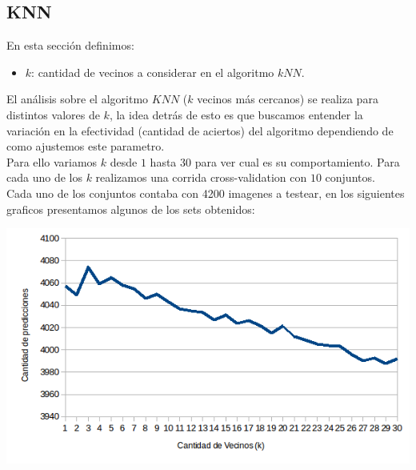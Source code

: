 \subsection{KNN}
En esta sección definimos:
\begin{itemize}
	\item $k$: cantidad de vecinos a considerar en el algoritmo $kNN$.
\end{itemize}
El análisis sobre el algoritmo $KNN$ ($k$ vecinos más cercanos) se realiza para distintos valores de $k$, la idea detrás de esto es que buscamos entender la variación en la efectividad (cantidad de aciertos) del algoritmo dependiendo de como ajustemos este parametro.
\\
Para ello variamos $k$ desde $1$ hasta $30$ para ver cual es su comportamiento. Para cada uno de los $k$ realizamos una corrida cross-validation con $10$ conjuntos.
\\
Cada uno de los conjuntos contaba con 4200 imagenes a testear, en los siguientes graficos presentamos algunos de los sets obtenidos:
\begin{center}
\includegraphics[scale=0.55]{nuevosResultados/knn/1.png}
\end{center}

